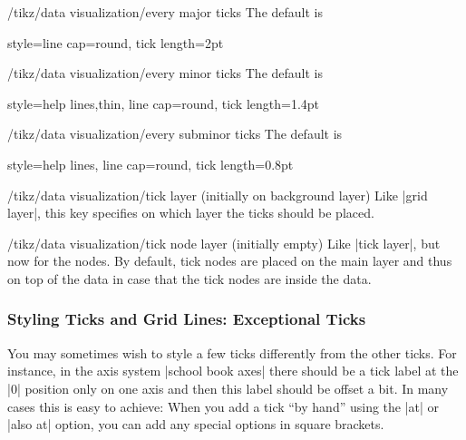 \begin{stylekey}{/tikz/data visualization/every major ticks}
    The default is
\begin{codeexample}
  style={line cap=round}, tick length=2pt
\end{codeexample}
\end{stylekey}

\begin{stylekey}{/tikz/data visualization/every minor ticks}
    The default is
\begin{codeexample}
  style={help lines,thin, line cap=round}, tick length=1.4pt
\end{codeexample}
\end{stylekey}

\begin{stylekey}{/tikz/data visualization/every subminor ticks}
    The default is
\begin{codeexample}
  style={help lines, line cap=round}, tick length=0.8pt
\end{codeexample}
\end{stylekey}

\begin{stylekey}{/tikz/data visualization/tick layer (initially on background layer)}
    Like |grid layer|, this key specifies on which layer the ticks should be
    placed.
\end{stylekey}

\begin{stylekey}{/tikz/data visualization/tick node layer (initially \normalfont empty)}
    Like |tick layer|, but now for the nodes. By default, tick nodes are placed
    on the main layer and thus on top of the data in case that the tick nodes
    are inside the data.
\end{stylekey}


\subsubsection{Styling Ticks and Grid Lines: Exceptional Ticks}

You may sometimes wish to style a few ticks differently from the other ticks.
For instance, in the axis system |school book axes| there should be a tick
label at the |0| position only on one axis and then this label should be offset
a bit. In many cases this is easy to achieve: When you add a tick ``by hand''
using the |at| or |also at| option, you can add any special options in square
brackets.


